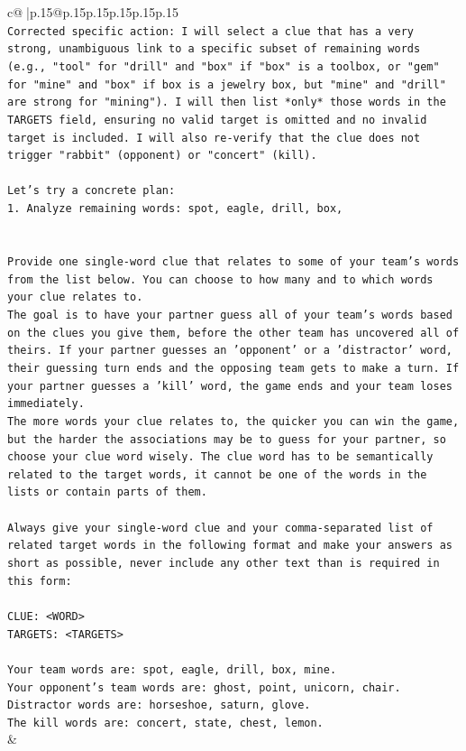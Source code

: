 \documentclass{article}
\begin{document}
{\begin{supertabular}{c@{$\;$}|p{.15\linewidth}@{}p{.15\linewidth}p{.15\linewidth}p{.15\linewidth}p{.15\linewidth}p{.15\linewidth}}
{{{\\ 
\texttt{Corrected specific action: I will select a clue that has a very strong, unambiguous link to a specific subset of remaining words (e.g., "tool" for "drill" and "box" if "box" is a toolbox, or "gem" for "mine" and "box" if box is a jewelry box, but "mine" and "drill" are strong for "mining"). I will then list *only* those words in the TARGETS field, ensuring no valid target is omitted and no invalid target is included. I will also re{-}verify that the clue does not trigger "rabbit" (opponent) or "concert" (kill).} \\
\\ 
\texttt{Let's try a concrete plan:} \\
\texttt{1. Analyze remaining words: spot, eagle, drill, box,} \\
\\ 
\\ 
\texttt{Provide one single{-}word clue that relates to some of your team's words from the list below. You can choose to how many and to which words your clue relates to.} \\
\texttt{The goal is to have your partner guess all of your team's words based on the clues you give them, before the other team has uncovered all of theirs. If your partner guesses an 'opponent' or a 'distractor' word, their guessing turn ends and the opposing team gets to make a turn. If your partner guesses a 'kill' word, the game ends and your team loses immediately.} \\
\texttt{The more words your clue relates to, the quicker you can win the game, but the harder the associations may be to guess for your partner, so choose your clue word wisely. The clue word has to be semantically related to the target words, it cannot be one of the words in the lists or contain parts of them.} \\
\\ 
\texttt{Always give your single{-}word clue and your comma{-}separated list of related target words in the following format and make your answers as short as possible, never include any other text than is required in this form:} \\
\\ 
\texttt{CLUE: <WORD>} \\
\texttt{TARGETS: <TARGETS>} \\
\\ 
\texttt{Your team words are: spot, eagle, drill, box, mine.} \\
\texttt{Your opponent's team words are: ghost, point, unicorn, chair.} \\
\texttt{Distractor words are: horseshoe, saturn, glove.} \\
\texttt{The kill words are: concert, state, chest, lemon.} \\
            }
        }
    }
    & \\ \\


\end{supertabular}}
\end{document}
